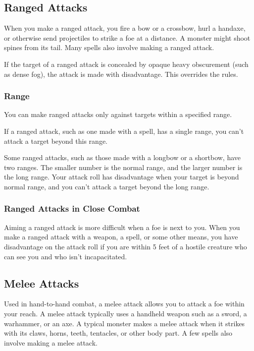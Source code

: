 \subsection{Ranged Attacks}

When you make a ranged attack, you fire a bow or a crossbow, hurl a handaxe, or otherwise send projectiles to strike a foe at a distance. A monster might shoot spines from its tail. Many spells also involve making a ranged attack.

If the target of a ranged attack is concealed by opaque heavy obscurement (such as dense fog), the attack is made with disadvantage. This overrides the  rules.

\subsubsection{Range}

You can make ranged attacks only against targets within a specified range.

If a ranged attack, such as one made with a spell, has a single range, you can't attack a target beyond this range.

Some ranged attacks, such as those made with a longbow or a shortbow, have two ranges. The smaller number is the normal range, and the larger number is the long range. Your attack roll has disadvantage when your target is beyond normal range, and you can't attack a target beyond the long range.

\subsubsection{Ranged Attacks in Close Combat}

Aiming a ranged attack is more difficult when a foe is next to you. When you make a ranged attack with a weapon, a spell, or some other means, you have disadvantage on the attack roll if you are within 5 feet of a hostile creature who can see you and who isn't incapacitated.

\subsection{Melee Attacks}

Used in hand-to-hand combat, a melee attack allows you to attack a foe within your reach. A melee attack typically uses a handheld weapon such as a sword, a warhammer, or an axe. A typical monster makes a melee attack when it strikes with its claws, horns, teeth, tentacles, or other body part. A few spells also involve making a melee attack.

